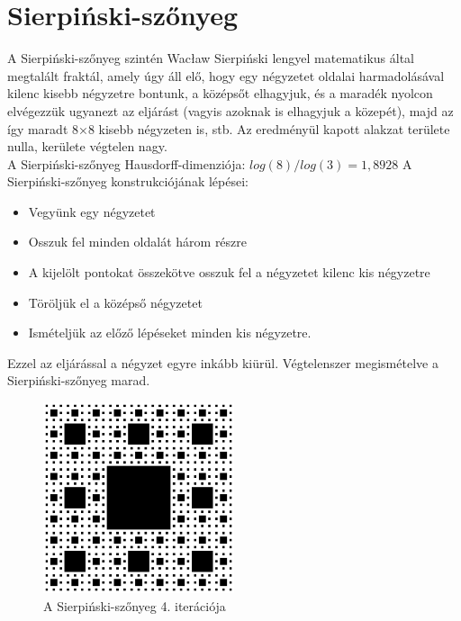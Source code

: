 \section*{Sierpiński-szőnyeg}
A Sierpiński-szőnyeg szintén Wacław Sierpiński lengyel matematikus által megtalált fraktál, amely úgy áll elő, hogy egy négyzetet oldalai harmadolásával kilenc kisebb négyzetre bontunk, a középsőt elhagyjuk, és a maradék nyolcon elvégezzük ugyanezt az eljárást (vagyis azoknak is elhagyjuk a közepét), majd az így maradt 8×8 kisebb négyzeten is, stb. Az eredményül kapott alakzat területe nulla, kerülete végtelen nagy.\\ 
A Sierpiński-szőnyeg Hausdorff-dimenziója: $log(8)/log(3) = 1,8928$
A Sierpiński-szőnyeg konstrukciójának lépései:
\begin{itemize}
	\item Vegyünk egy négyzetet
	\item Osszuk fel minden oldalát három részre
	\item A kijelölt pontokat összekötve osszuk fel a négyzetet kilenc kis négyzetre
	\item Töröljük el a középső négyzetet
	\item Ismételjük az előző lépéseket minden kis négyzetre.
\end{itemize}
Ezzel az eljárással a négyzet egyre inkább kiürül. Végtelenszer megismételve a Sierpiński-szőnyeg marad.
\begin{figure}[!ht]
	\begin{center}
		\includegraphics[width=0.5\textwidth]{img/SierpinskiCarpet}
		\caption[labelInTOC]{A Sierpiński-szőnyeg 4. iterációja}
	\end{center}
\end{figure}
